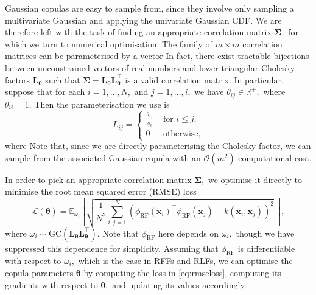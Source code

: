 Gaussian copulas are easy to sample from, since they involve only sampling a multivariate Gaussian and applying the univariate Gaussian CDF.
We are therefore left with the task of finding an appropriate correlation matrix $\boldsymbol{\Sigma},$ for which we turn to numerical optimisation.
The family of $m \times m$ correlation matrices can be parameterised by a vector 
In fact, there exist tractable bijections between unconstrained vectors of real numbers  and lower triangular Cholesky factors $\mathbf{L}_{\boldsymbol{\theta}}$ such that $\boldsymbol{\Sigma} = \mathbf{L}_{\boldsymbol{\theta}}\mathbf{L}_{\boldsymbol{\theta}}^\top$ is a valid correlation matrix.
In particular, suppose that for each $i = 1, \dots, N,$ and $j = 1, \dots, i,$ we have $\theta_{ij} \in \mathbb{R}^+,$ where $\theta_{ii} = 1.$
Then the parameterisation we use is
\begin{equation}
L_{ij} = \begin{cases}
\frac{\theta_{ij}}{s_i} & \text{ for } i \leq j, \\
0 & \text{ otherwise},
\end{cases}
\end{equation}
where 
Note that, since we are directly parameterising the Cholesky factor, we can sample from the associated Gaussian copula with an $\mathcal{O}(m^2)$ computational cost.

In order to pick an appropriate correlation matrix $\boldsymbol{\Sigma},$ we optimise it directly to minimise the root mean squared error (RMSE) loss
\begin{equation}
    \label{eq:rmseloss}
    \mathcal{L}(\boldsymbol{\theta}) = \mathbb{E}_{\omega_i}\left[\sqrt{\frac{1}{N^2}\sum_{i, j=1}^N (\phi_{\text{RF}}(\boldsymbol{x}_i)^\top\phi_{\text{RF}}(\boldsymbol{x}_j) - k(\boldsymbol{x}_i, \boldsymbol{x}_j))^2}~\right],
\end{equation}
where $\omega_i \sim \text{GC}(\mathbf{L}_{\boldsymbol{\theta}}\mathbf{L}_{\boldsymbol{\theta}}^\top).$
Note that $\phi_{\text{RF}}$ here depends on $\omega_i,$ though we have suppressed this dependence for simplicity.
Assuming that $\phi_{\text{RF}}$ is differentiable with respect to $\omega_i,$ which is the case in RFFs and RLFs, we can optimise the copula parameters $\boldsymbol{\theta}$ by computing the loss in \cref{eq:rmseloss}, computing its gradients with respect to $\boldsymbol{\theta},$ and updating its values accordingly.

